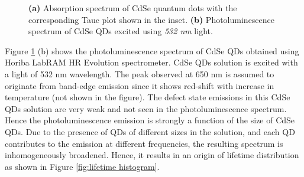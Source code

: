 \documentclass[%
 aip,
 amsmath,amssymb,
 reprint,%
]{revtex4-1}
\begin{document}
\begin{figure}
    \centering
    \caption{\textbf{(a)} Absorption spectrum of CdSe quantum dots with the corresponding Tauc plot shown in the inset. \textbf{(b)} Photoluminescence spectrum of CdSe QDs excited using \textit{532 nm} light.}
    \label{fig:optical spectra}
\end{figure}

Figure \ref{fig:optical spectra} (b) shows the photoluminescence spectrum of CdSe QDs obtained using Horiba LabRAM HR Evolution spectrometer. CdSe QDs solution is excited with a light of 532 nm wavelength. The peak observed at 650 nm is assumed to originate from band-edge emission since it shows red-shift with increase in temperature (not shown in the figure). The defect state emissions in this CdSe QDs solution are very weak and not seen in the photoluminescence spectrum. Hence the photoluminescence emission is strongly a function of the size of CdSe QDs. Due to the presence of QDs of different sizes in the solution, and each QD contributes to the emission at different frequencies, the resulting spectrum is inhomogeneously broadened. Hence, it results in an origin of lifetime distribution as shown in Figure \ref{fig:lifetime histogram}.



\end{document}
